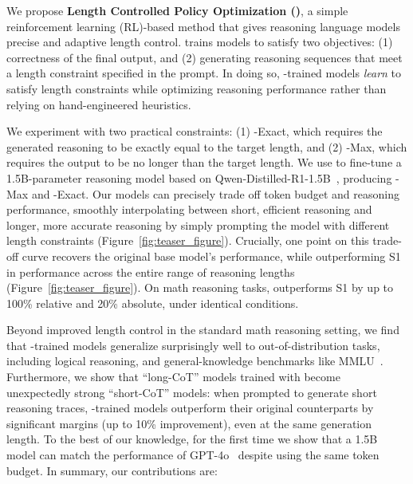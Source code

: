 We propose \textbf{Length Controlled Policy Optimization (\ours{})}, a simple reinforcement learning (RL)-based method that gives reasoning language models precise and adaptive length control.
\ours{} 
trains models to satisfy two objectives:
(1) correctness of the final output, and (2) generating reasoning sequences that meet a length constraint specified in the prompt.
In doing so, \ours{}-trained models \textit{learn} to satisfy length constraints while optimizing reasoning performance rather than relying on hand-engineered heuristics.

We experiment with two practical constraints: (1) \ours{}-Exact, which requires the generated reasoning to be exactly equal to the target length, and (2) \ours{}-Max, which requires the output to be no longer than the target length.
We use \ours{} to fine-tune a 1.5B-parameter reasoning model based on Qwen-Distilled-R1-1.5B~\citep{deepseekai2025deepseekr1incentivizingreasoningcapability, qwen2025qwen25technicalreport}, producing \model{}-Max and \model{}-Exact.
Our \model{} models can precisely trade off token budget and reasoning performance, smoothly interpolating between short, efficient reasoning and longer, more accurate reasoning by simply prompting the model with different length constraints (Figure~\ref{fig:teaser_figure}). Crucially, one point on this trade-off curve recovers the original base model's performance, while outperforming S1~\citep{muennighoff2025s1simpletesttimescaling} in performance across the entire range of reasoning lengths (Figure~\ref{fig:teaser_figure}). On math reasoning tasks, \model{} outperforms S1 by up to 100\% relative and 20\% absolute, under identical conditions.

Beyond improved length control in the standard math reasoning setting, we find that \ours{}-trained models generalize surprisingly well to out-of-distribution tasks, including logical reasoning, and general-knowledge benchmarks like MMLU~\citep{hendrycks2021measuringmassivemultitasklanguage}.
Furthermore, we show that ``long-CoT'' models trained with \ours{} become unexpectedly strong ``short-CoT'' models: when prompted to generate short reasoning traces, \ours{}-trained models outperform their original counterparts by significant margins (up to 10\% improvement), even at the same generation length. To the best of our knowledge, for the first time we show that a 1.5B model can match the performance of GPT-4o~\citep{openai2024gpt4technicalreport} despite using the same token budget.
% 
In summary, our contributions are:

